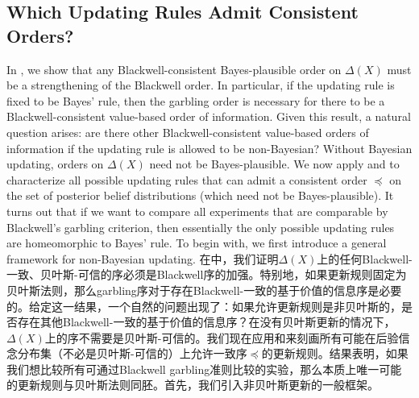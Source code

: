 \documentclass[12pt,letterpaper]{article}
\newenvironment{original}{\color{black}}{}
\newenvironment{translation}{\color{blue}}{}
\theoremstyle{plain}
\theoremstyle{definition}
\theoremstyle{remark}
\theoremstyle{definition}
\begin{document}
\subsection{Which Updating Rules Admit Consistent Orders?}
\begin{original}
In , we show that any Blackwell-consistent Bayes-plausible order on $\Delta(X)$ must be a strengthening of the Blackwell order. In particular, if the updating rule is fixed to be Bayes' rule, then the garbling order is necessary for there to be a Blackwell-consistent value-based order of information. Given this result, a natural question arises: are there other Blackwell-consistent value-based orders of information if the updating rule is allowed to be non-Bayesian? Without Bayesian updating, orders on $\Delta(X)$ need not be Bayes-plausible. We now apply  and  to characterize all possible updating rules that can admit a consistent order $\preceq$ on the set of posterior belief distributions (which need not be Bayes-plausible). It turns out that if we want to compare all experiments that are comparable by Blackwell's garbling criterion, then essentially the only possible updating rules are homeomorphic to Bayes' rule. To begin with, we first introduce a general framework for non-Bayesian updating.
\end{original}
\begin{translation}
在中，我们证明$\Delta(X)$上的任何Blackwell-一致、贝叶斯-可信的序必须是Blackwell序的加强。特别地，如果更新规则固定为贝叶斯法则，那么garbling序对于存在Blackwell-一致的基于价值的信息序是必要的。给定这一结果，一个自然的问题出现了：如果允许更新规则是非贝叶斯的，是否存在其他Blackwell-一致的基于价值的信息序？在没有贝叶斯更新的情况下，$\Delta(X)$上的序不需要是贝叶斯-可信的。我们现在应用和来刻画所有可能在后验信念分布集（不必是贝叶斯-可信的）上允许一致序$\preceq$的更新规则。结果表明，如果我们想比较所有可通过Blackwell garbling准则比较的实验，那么本质上唯一可能的更新规则与贝叶斯法则同胚。首先，我们引入非贝叶斯更新的一般框架。
\end{translation}
\end{document}
